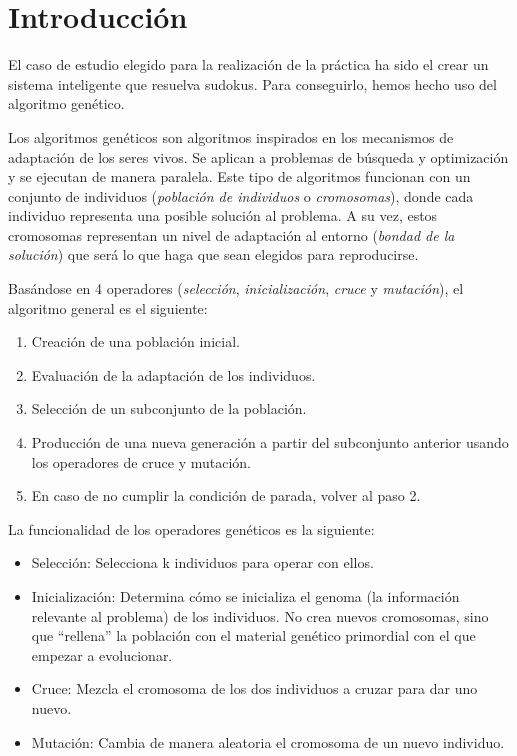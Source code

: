 \documentclass[a4,11pt]{article}
\begin{document}
\newpage
\tableofcontents
\newpage

\section{Introducción}

\indent El caso de estudio elegido para la realización de la práctica ha sido el crear un sistema inteligente que resuelva sudokus. Para conseguirlo, hemos hecho uso del algoritmo genético.


Los algoritmos genéticos son algoritmos inspirados en los mecanismos de adaptación de los seres vivos. Se aplican a problemas de búsqueda y optimización y se ejecutan de manera paralela. Este tipo de algoritmos funcionan con un conjunto de individuos (\emph{población de individuos} o \emph{cromosomas}), donde cada individuo representa una posible solución al problema. A su vez, estos cromosomas representan un nivel de adaptación al entorno (\emph{bondad de la solución}) que será lo que haga que sean elegidos para reproducirse.

Basándose en 4 operadores (\emph{selección}, \emph{inicialización}, \emph{cruce} y \emph{mutación}), el algoritmo general es el siguiente:

\begin{enumerate}

\item Creación de una población inicial.

\item Evaluación de la adaptación de los individuos.

\item Selección de un subconjunto de la población.

\item Producción de una nueva generación a partir del subconjunto 
anterior usando los operadores de cruce y mutación.

\item En caso de no cumplir la condición de parada, volver al paso 2.

\end{enumerate}

    
La funcionalidad de los operadores genéticos es la siguiente:

\begin{itemize}
\item Selección: Selecciona k individuos para operar con ellos.

\item Inicialización: Determina cómo se inicializa el genoma (la información relevante al problema) de los individuos. No crea nuevos cromosomas, sino que “rellena” la población con el material genético primordial con el que empezar a evolucionar.

\item Cruce: Mezcla el cromosoma de los dos individuos a cruzar para dar uno nuevo.

\item Mutación: Cambia de manera aleatoria el cromosoma de un nuevo individuo.
\end{itemize}
\end{document}
